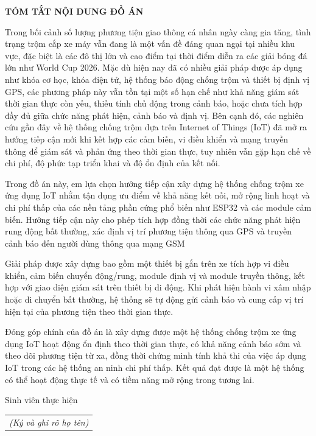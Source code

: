 \documentclass[../DoAn.tex]{subfiles}
\begin{document}
\begin{center}
    \Large{\textbf{TÓM TẮT NỘI DUNG ĐỒ ÁN}}\\
\end{center}
\vspace{1cm}

Trong bối cảnh số lượng phương tiện giao thông cá nhân ngày càng gia tăng, tình trạng trộm cắp xe máy vẫn đang là một vấn đề đáng quan ngại tại nhiều khu vực, đặc biệt là các đô thị lớn và cao điểm tại thời điểm diễn ra các giải bóng đá lớn như World Cup 2026. Mặc dù hiện nay đã có nhiều giải pháp được áp dụng như khóa cơ học, khóa điện tử, hệ thống báo động chống trộm và thiết bị định vị GPS, các phương pháp này vẫn tồn tại một số hạn chế như khả năng giám sát thời gian thực còn yếu, thiếu tính chủ động trong cảnh báo, hoặc chưa tích hợp đầy đủ giữa chức năng phát hiện, cảnh báo và định vị. Bên cạnh đó, các nghiên cứu gần đây về hệ thống chống trộm dựa trên Internet of Things (IoT) đã mở ra hướng tiếp cận mới khi kết hợp các cảm biến, vi điều khiển và mạng truyền thông để giám sát và phản ứng theo thời gian thực, tuy nhiên vẫn gặp hạn chế về chi phí, độ phức tạp triển khai và độ ổn định của kết nối.

Trong đồ án này, em lựa chọn hướng tiếp cận xây dựng hệ thống chống trộm xe ứng dụng IoT nhằm tận dụng ưu điểm về khả năng kết nối, mở rộng linh hoạt và chi phí thấp của các nền tảng phần cứng phổ biến như ESP32 và các module cảm biến. Hướng tiếp cận này cho phép tích hợp đồng thời các chức năng phát hiện rung động bất thường, xác định vị trí phương tiện thông qua GPS và truyền cảnh báo đến người dùng thông qua mạng GSM 

Giải pháp được xây dựng bao gồm một thiết bị gắn trên xe tích hợp vi điều khiển, cảm biến chuyển động/rung, module định vị và module truyền thông, kết hợp với giao diện giám sát trên thiết bị di động. Khi phát hiện hành vi xâm nhập hoặc di chuyển bất thường, hệ thống sẽ tự động gửi cảnh báo và cung cấp vị trí hiện tại của phương tiện theo thời gian thực.

Đóng góp chính của đồ án là xây dựng được một hệ thống chống trộm xe ứng dụng IoT hoạt động ổn định theo thời gian thực, có khả năng cảnh báo sớm và theo dõi phương tiện từ xa, đồng thời chứng minh tính khả thi của việc áp dụng IoT trong các hệ thống an ninh chi phí thấp. Kết quả đạt được là một hệ thống có thể hoạt động thực tế và có tiềm năng mở rộng trong tương lai.
\begin{flushright}
Sinh viên thực hiện\\
\begin{tabular}{@{}c@{}}
\textit{(Ký và ghi rõ họ tên)}
\end{tabular}
\end{flushright}
\end{document}
